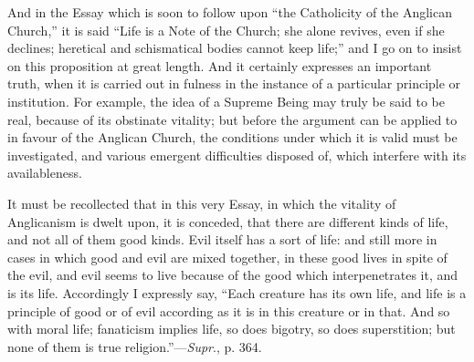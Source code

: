 And in the Essay which is soon to follow upon ``the
Catholicity of the Anglican Church,'' it is said ``Life is a Note of the
Church; she alone revives, even if she declines; heretical and
schismatical bodies cannot keep life;'' and I go on to insist on this
proposition at great length. And it certainly expresses an important
truth, when it is carried out in fulness in the instance of a
particular principle or institution. For example, the idea of a
Supreme Being may truly be said to be real, because of its obstinate
vitality; but before the argument can be applied to in favour of the
Anglican Church, the conditions under which it is valid must be
investigated, and various emergent difficulties disposed of, which
interfere with its availableness.

It must be recollected that in this very Essay,
in which the vitality of Anglicanism is dwelt upon, it is conceded,
that there are different kinds of life, and not all of them good
kinds. Evil itself has a sort of life: and still more in cases in
which good and evil are mixed together, in these good lives in spite
of the evil, and evil seems to live because of the good which
interpenetrates it, and is its life. Accordingly I expressly
say, ``Each creature has its own life, and life is a principle of good
or of evil according as it is in this creature or in that. And so with
moral life; fanaticism implies life, so does bigotry, so does
superstition; but none of them is true religion.''—\emph{Supr}., p. 364.

